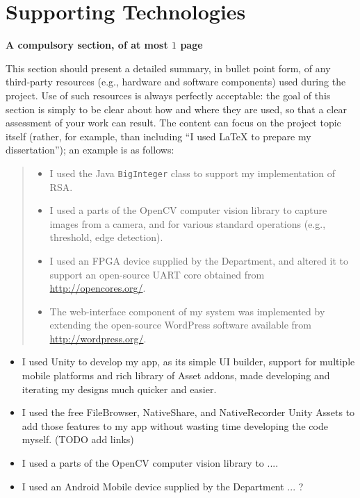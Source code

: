 \chapter*{Supporting Technologies}

{\bf A compulsory section, of at most $1$ page}
\vspace{1cm}

\noindent This section should present a detailed summary, in bullet point form,
of any third-party resources (e.g., hardware and software components)  used
during the project.  Use of such resources is always perfectly  acceptable: the
goal of this section is simply to be clear about how and where they are used, so
that a clear assessment of your work can result.  The content can focus on the
project topic itself (rather, for example, than including ``I used \mbox{\LaTeX}
to prepare my  dissertation''); an example is as follows:

\begin{quote}
\noindent
\begin{itemize}
\item I used the Java {\tt BigInteger} class to support my implementation
      of RSA.
\item I used a parts of the OpenCV computer vision library to capture
      images from a camera, and for various standard operations (e.g.,
      threshold, edge detection).
\item I used an FPGA device supplied by the Department, and altered it
      to support an open-source UART core obtained from
      \url{http://opencores.org/}.
\item The web-interface component of my system was implemented by
      extending the open-source WordPress software available from
      \url{http://wordpress.org/}.
\end{itemize}
\end{quote}


\begin{itemize}
\item I used Unity to develop my app, as its simple UI builder, support for multiple mobile platforms and rich library of Asset addons, made developing and iterating my designs much quicker and easier.
\item I used the free FileBrowser, NativeShare, and NativeRecorder Unity Assets to add those features to my app without wasting time developing the code myself. (TODO add links) 
\item I used a parts of the OpenCV computer vision library to ....
\item I used an Android Mobile device supplied by the Department ... ?

\end{itemize}

